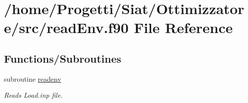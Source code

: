 \hypertarget{read_env_8f90}{\section{/home/\-Progetti/\-Siat/\-Ottimizzatore/src/read\-Env.f90 File Reference}
\label{read_env_8f90}
}
\subsection*{Functions/\-Subroutines}
\begin{DoxyCompactItemize}
\item 
subroutine \hyperlink{read_env_8f90_abbf9c1134a1b66ecec7138afb589e107}{readenv}
\begin{DoxyCompactList}\small\item\em Reads Load.\-inp file. \end{DoxyCompactList}\end{DoxyCompactItemize}


